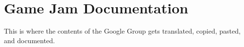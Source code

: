 
\chapter{Game Jam Documentation} %

\label{AppendixC} %


This is where the contents of the Google Group gets translated, copied, pasted, and documented.